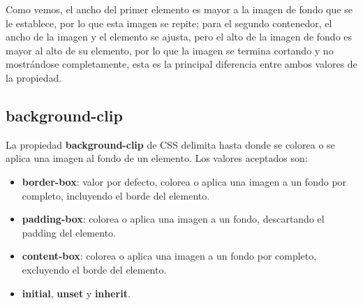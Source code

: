 Como vemos, el ancho del primer elemento es mayor a la imagen de fondo que se le establece, por lo que esta imagen se repite; para el segundo contenedor, el ancho de la imagen y el elemento se ajusta, pero el alto de la imagen de fondo es mayor al alto de su elemento, por lo que la imagen se termina cortando y no mostrándose completamente, esta es la principal diferencia entre ambos valores de la propiedad.


\subsection{background-clip}

La propiedad \textbf{background-clip} de CSS delimita hasta donde se colorea o se aplica una imagen al fondo de un elemento. Los valores aceptados son:
\begin{itemize}
    \item \textbf{border-box}: valor por defecto, colorea o aplica una imagen a un fondo por completo, incluyendo el borde del elemento.
    \item \textbf{padding-box}: colorea o aplica una imagen a un fondo, descartando el padding del elemento.
    \item \textbf{content-box}: colorea o aplica una imagen a un fondo por completo, excluyendo el borde del elemento.
    \item \textbf{initial}, \textbf{unset} y \textbf{inherit}.
\end{itemize}

